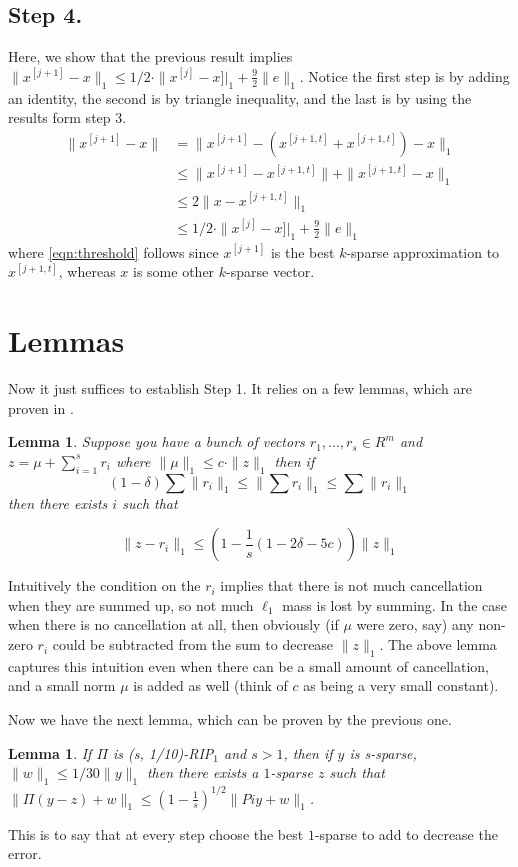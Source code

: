 \documentclass[11pt]{article}
\newtheorem{lemma}[theorem]{Lemma}
\begin{document}
\subsection{Step 4.}
Here, we show that the previous result implies $\| x^{[j+1]} - x \|_1 \le 1/2 \cdot \| x^{[j]} - x ]|_1  + \frac{9}{2} \|e\|_1$. Notice the first step is by adding an identity, the second is by triangle inequality, and the last is by using the results form step 3.
\begin{align}
\nonumber \|x^{[j + 1]} - x\| &= \|x^{[j + 1]} - (x^{[j + 1, t]} + x^{[j + 1, t]}) - x\|_1 \\
\nonumber &\le \|x^{[j + 1]} - x^{[j + 1, t]}\| + \|x^{[j + 1, t]} - x\|_1 \\
&\le 2 \|x - x^{[j + 1, t]}\|_1 \label{eqn:threshold}\\
\nonumber &\le 1/2 \cdot \| x^{[j]} - x ]|_1 + \frac{9}{2} \|e\|_1 
\end{align}
where \eqref{eqn:threshold} follows since $x^{[j+1]}$ is the best $k$-sparse approximation to $x^{[j+1,t]}$, whereas $x$ is some other $k$-sparse vector.

\section{Lemmas}
Now it just suffices to establish Step 1. It relies on a few lemmas, which are proven in \cite{Price10}.

\begin{lemma}
Suppose you have a bunch of vectors  $r_1, ..., r_s \in R^{m}$ and $z = \mu + \sum_{i = 1}^s r_i$
where $\|\mu\|_1 \le c \cdot \|z\|_1$ then if
$$(1 - \delta) \sum \|r_i\|_1 \le \|\sum r_i\|_1 \le \sum \|r_i\|_1$$ then there exists $i$ such that

$$\|z - r_i\|_1 \le (1 - \frac{1}{s}(1 - 2\delta - 5c))\|z\|_1$$
\end{lemma}
Intuitively the condition on the $r_i$ implies that there is not much cancellation when they are summed up, so not much $\ell_1$ mass is lost by summing. In the case when there is no cancellation at all, then obviously (if $\mu$ were zero, say) any non-zero $r_i$ could be subtracted from the sum to decrease $\|z\|_1$. The above lemma captures this intuition even when there can be a small amount of cancellation, and a small norm $\mu$ is added as well (think of $c$ as being a very small constant).

Now we have the next lemma, which can be proven by the previous one.

\begin{lemma}
If $\Pi$ is (s, 1/10)-RIP$_1$ and $s > 1$, then if $y$ is s-sparse, $\|w\|_1 \le 1/30 \|y\|_1$ then there exists a $1$-sparse $z$ such that $\|\Pi(y-z) + w\|_1 \le (1 - \frac{1}{s})^{1/2} \|Pi y + w\|_1$.
\end{lemma}
This is to say that at every step choose the best $1$-sparse to add to decrease the error.
\end{document}
